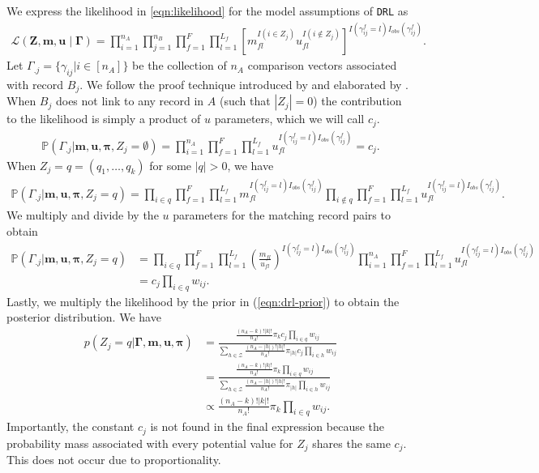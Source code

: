 \documentclass[12pt,letterpaper]{article}
\newcommand{\1}[1]{\mathbb{I}\!\left[#1\right]} %
\begin{document}
We express the likelihood in \eqref{eqn:likelihood} for the model assumptions of \texttt{DRL} as
\begin{align*} %
	\mathcal{L}(\bm{Z}, \bm{m}, \bm{u} \mid \bm{\Gamma})=\prod_{i=1}^{n_A}\prod_{j=1}^{n_B}\prod_{f=1}^F\prod_{l=1}^{L_f}\left[m_{fl}^{I(i \in Z_j)}u_{fl}^{I(i \notin Z_j)}\right] ^{I(\gamma_{ij}^{f} = l) I_{obs}(\gamma_{ij}^f)}.
\end{align*}
Let $\Gamma_{.j} = \{\gamma_{ij} | i \in [n_A]\}$ be the collection of $n_A$ comparison vectors associated with record $B_j$. We follow the proof technique introduced by \cite{wortman2019} and elaborated by \cite{kundinger_2023}. When $B_j$ does not link to any record in $A$ (such that $|Z_j| = 0$) the contribution to the likelihood is simply a product of $u$ parameters, which we will call $c_j$. 
\begin{align*}
	\mathbb{P}(\Gamma_{.j}| \bm{m}, \bm{u}, \bm{\pi}, Z_j = \emptyset) = \prod_{i=1}^{n_A}\prod_{f=1}^{F}\prod_{l=1}^{L_f} u_{fl}^{I(\gamma_{ij}^f = l)I_{obs}(\gamma_{ij}^f)} = c_j.
\end{align*}
When $Z_j = q =  (q_1, \ldots, q_k)$ for some $|q| > 0$, we have
\begin{align*}
	\mathbb{P}(\Gamma_{.j}| \bm{m}, \bm{u}, \bm{\pi},  Z_j = q) =\prod_{i \in q}\prod_{f=1}^{F}\prod_{l=1}^{L_f} m_{fl}^{I(\gamma_{ij}^f = l)I_{obs}(\gamma_{ij}^f)}  \prod_{i \notin q}\prod_{f=1}^{F}\prod_{l=1}^{L_f} u_{fl}^{I(\gamma_{ij}^f = l)I_{obs}(\gamma_{ij}^f)}.
\end{align*}
We multiply and divide by the $u$ parameters for the matching record pairs to obtain
\begin{align*}
	\mathbb{P}(\Gamma_{.j}| \bm{m}, \bm{u}, \bm{\pi}, Z_j = q) &= \prod_{i \in q}\prod_{f=1}^{F}\prod_{l=1}^{L_f} \left(\frac{m_{fl}}{u_{fl}}\right)^{I(\gamma_{ij}^f = l)I_{obs}(\gamma_{ij}^f)}  \prod_{i = 1}^{n_A}\prod_{f=1}^{F}\prod_{l=1}^{L_f} u_{fl}^{I(\gamma_{ij}^f = l)I_{obs}(\gamma_{ij}^f)} \\
	&= c_j \prod_{i \in q} w_{ij} .
\end{align*}
Lastly, we multiply the likelihood by the prior in (\ref{eqn:drl-prior}) to obtain the posterior distribution. We have
	\begin{align*}
		p\left(Z_j  = q|\bm{\Gamma}, \bm{m}, \bm{u}, \bm{\pi} \right) &= \frac{\frac{(n_A - k)!|k|!}{n_A!} \pi_{k} c_j \prod_{i \in q} w_{ij}}{\sum_{h \in \mathcal{Z}} \frac{(n_A - |h|)!|h|!}{n_A!} \pi_{|h|} c_j \prod_{i \in h} w_{ij}} \\
		&= \frac{\frac{(n_A - k)!|k|!}{n_A!} \pi_{k} \prod_{i \in q} w_{ij}}{\sum_{h \in \mathcal{Z}} \frac{(n_A - |h|)!|h|!}{n_A!} \pi_{|h|} \prod_{i \in h} w_{ij}} \\
		&\propto \frac{(n_A - k)!|k|!}{n_A!} \pi_{k} \prod_{i \in q} w_{ij}.
	\end{align*}
Importantly, the constant $c_j$ is not found in the final expression because the probability mass associated with every potential value for $Z_j$ shares the same $c_j$. This does not occur due to proportionality.
\end{document}
